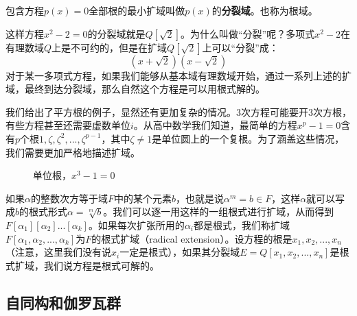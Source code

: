 \documentclass{article}
\begin{document}
 
\begin{definition}
包含方程$p(x) = 0$全部根的最小扩域叫做$p(x)$的\textbf{分裂域}。也称为根域。
\end{definition}

这样方程$x^2 -2 = 0$的分裂域就是$Q[\sqrt{2}]$。为什么叫做“分裂”呢？多项式$x^2-2$在有理数域$Q$上是不可约的，但是在扩域$Q[\sqrt{2}]$上可以“分裂”成：
\[
(x + \sqrt{2}) (x - \sqrt{2})
\]
对于某一多项式方程，如果我们能够从基本域有理数域开始，通过一系列上述的扩域，最终到达分裂域，那么自然这个方程是可以用根式解的。

我们给出了平方根的例子，显然还有更加复杂的情况。3次方程可能要开3次方根，有些方程甚至还需要虚数单位$i$。从高中数学我们知道，最简单的方程$x^p-1=0$含有$p$个根$1, \zeta, \zeta^2, ..., \zeta^{p-1}$，其中$\zeta \neq 1$是单位圆上的一个复根。为了涵盖这些情况，我们需要更加严格地描述扩域。

\begin{figure}[htbp]
\centering
{}
\caption{单位根，$x^3 - 1 = 0$}
\label{fig:root-of-unity}
\end{figure}

如果$\alpha$的整数次方等于域$F$中的某个元素$b$，也就是说$\alpha^m = b \in F$，这样$\alpha$就可以写成$b$的根式形式$\alpha = \sqrt[m]{b}$。我们可以逐一用这样的一组根式进行扩域，从而得到$F[\alpha_1][\alpha_2]...[\alpha_k]$。如果每次扩张所用的$\alpha_i$都是根式，我们称扩域$F[\alpha_1, \alpha_2, ..., \alpha_k]$为$F$的根式扩域（radical extension）。设方程的根是$x_1, x_2, ..., x_n$（注意，这里我们没有说$x_i$一定是根式），如果其分裂域$E = Q[x_1, x_2, ..., x_n]$是根式扩域，我们说方程是根式可解的。

\begin{Exercise}
\end{Exercise}

\subsection{自同构和伽罗瓦群}
\end{document}
